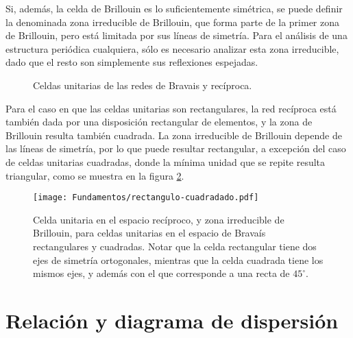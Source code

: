 Si, además, la celda de Brillouin es lo suficientemente simétrica, se puede definir la denominada zona irreducible de Brillouin, que forma parte de la primer zona de Brillouin, pero está limitada por sus líneas de simetría. Para el análisis de una estructura periódica cualquiera, sólo es necesario analizar esta zona irreducible, dado que el resto son simplemente sus reflexiones espejadas.

\begin{figure}[H]
	\centering 
	\hspace{0pt}
	\caption{Celdas unitarias de las redes de Bravais y recíproca.}
	\label{fig:celdas-unitarias}
\end{figure}

Para el caso en que las celdas unitarias son rectangulares, la red recíproca está también dada por una disposición rectangular de elementos, y la zona de Brillouin resulta también cuadrada. La zona irreducible de Brillouin depende de las líneas de simetría, por lo que puede resultar rectangular, a excepción del caso de celdas unitarias cuadradas, donde la mínima unidad que se repite resulta triangular, como se muestra en la figura \ref{fig:rectangulo-cuadrado}.

\begin{figure}[htp]
	\centering
	\texttt{[image: Fundamentos/rectangulo-cuadradado.pdf]}
	\caption{Celda unitaria en el espacio recíproco, y zona irreducible de Brillouin, para celdas unitarias en el espacio de Bravaís rectangulares y cuadradas. Notar que la celda rectangular tiene dos ejes de simetría ortogonales, mientras que la celda cuadrada tiene los mismos ejes, y además con el que corresponde a una recta de $45^{\circ}$.}
	\label{fig:rectangulo-cuadrado}
\end{figure}



\section{Relación y diagrama de dispersión}
\label{sec:diag-de-dispersion}

